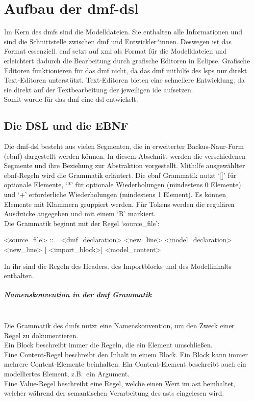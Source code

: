 \documentclass[./einleitung.tex]{subfiles}
\begin{document}
\section{Aufbau der \acrshort{dmf}-\acrshort{dsl}}
Im Kern des \acrshort{dmf}s sind die Modelldateien.
Sie enthalten alle Informationen und sind die Schnittstelle zwischen \acrshort{dmf} und Entwickler*innen.
Deswegen ist das Format essenziell.
\acrshort{emf} setzt auf \acrshort{xml} als Format für die Modelldateien und erleichtert dadurch die Bearbeitung durch grafische Editoren in Eclipse.
Grafische Editoren funktionieren für das \acrshort{dmf} nicht, da das \acrshort{dmf} mithilfe des \acrlong{lsp}s nur direkt Text-Editoren unterstützt.
Text-Editoren bieten eine schnellere Entwicklung, da sie direkt auf der Textbearbeitung der jeweiligen \acrshort{ide} aufsetzen. \\
Somit wurde für das \acrshort{dmf} eine \acrfull{dsl} entwickelt.
\subsection{Die DSL und die EBNF}
Die \acrshort{dmf}-\acrshort{dsl} besteht aus vielen Segmenten, die in erweiterter Backus-Naur-Form (\acrshort{ebnf}) dargestellt werden können.
In diesem Abschnitt werden die verschiedenen Segmente und ihre Beziehung zur Abstraktion vorgestellt.
Mithilfe ausgewählter \acrshort{ebnf}-Regeln wird die Grammatik erläutert.\newline \newline
Die \acrshort{ebnf} Grammatik nutzt `[]' für optionale Elemente, `*' für optionale Wiederholungen (mindestens 0 Elemente) und `+' erforderliche Wiederholungen (mindestens 1 Element).
Es können Elemente mit Klammern gruppiert werden.
Für Tokens werden die regulären Ausdrücke angegeben und mit einem `R' markiert.\\

Die Grammatik beginnt mit der Regel `source\_file':
\begin{grammar}
<source\_file> ::= <dmf_declaration> <new_line> <model_declaration> <new_line> [ <import_block>] <model_content>
\end{grammar}
In ihr sind die Regeln des Headers, des Importblocks und des Modellinhalts enthalten.

\subparagraph{Namenskonvention in der \acrshort{dmf} Grammatik}\mbox{}\\
Die Grammatik des \acrshort{dmf}s nutzt eine Namenskonvention, um den Zweck einer Regel zu dokumentieren.\\
Ein Block beschreibt immer die Regeln, die ein Element umschließen. \\
Eine Content-Regel beschreibt den Inhalt in einem Block.
Ein Block kann immer mehrere Content-Elemente beinhalten.
Ein Content-Element beschreibt auch ein modelliertes Element, z.B.\ ein Argument. \\
Eine Value-Regel beschreibt eine Regel, welche einen Wert im \acrshort{ast} beinhaltet, welcher während der semantischen Verarbeitung des \acrshort{ast}s eingelesen wird.
\end{document}
